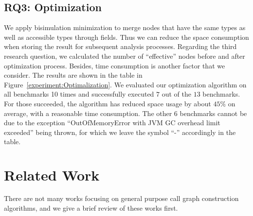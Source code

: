 \documentclass{llncs}
\begin{document}
\subsection{RQ3: Optimization}\label{subsec:optimization}

We apply bisimulation minimization to merge nodes that have the same types as well as accessible types through fields. Thus we can reduce the space consumption when storing the result for subsequent analysis processes. Regarding the third research question, we calculated the number of ``effective'' nodes before and after optimization process. Besides, time consumption is another factor that we consider. The results are shown in the table in Figure~\ref{experiment:Optimalization}. We evaluated our optimization algorithm on all benchmarks 10 times and successfully executed $7$ out of the $13$ benchmarks. For those succeeded, the algorithm has reduced space usage by about $45\%$ on average, with a reasonable time consumption. The other $6$ benchmarks cannot be due to the exception ``OutOfMemoryError with JVM GC overhead limit exceeded'' being thrown, for which we leave the symbol ``-'' accordingly in the table.


\section{Related Work}\label{sec:related-work}

There are not many works focusing on general purpose call graph construction algorithms, and we give a brief review of these works first.
\end{document}
